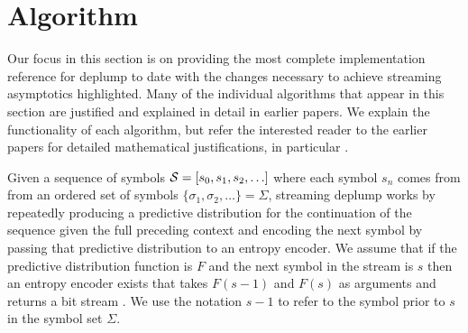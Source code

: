 \section{Algorithm}
%
%

Our focus in this section is on providing the most complete implementation reference for deplump to date with the changes necessary to achieve streaming asymptotics highlighted.  Many of the individual algorithms that appear in this section are justified and explained in detail in earlier papers.  We explain the functionality of each algorithm, but refer the interested reader to the earlier papers for detailed mathematical justifications, in particular \citep{Wood2009,Gasthaus2010,Bartlett2010}.

Given a sequence of symbols $\Seq = [s_0, s_1, s_2, \ldots]$ where each symbol $s_n$ comes from from an ordered set of symbols $\{\sigma_1, \sigma_2, \ldots\} = \Sigma$,  streaming deplump works by repeatedly producing a predictive distribution for the continuation of the sequence given the full preceding context and encoding the next symbol by passing that predictive distribution to an entropy encoder. %
We assume that if the predictive distribution function is $F$ and the next symbol in the stream is $s$ then %
an entropy encoder exists that takes $F(s-1)$ and $F(s)$ as arguments and returns a bit stream \citep{Witten1987}. %
We use the notation $s-1$ to refer to the symbol prior to $s$ in the symbol set $\Sigma$.  %

